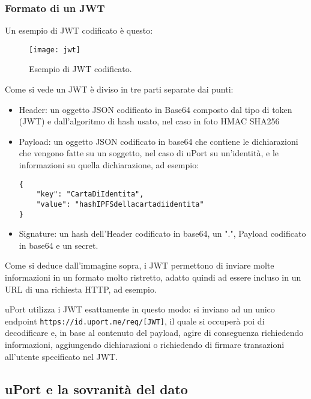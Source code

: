 \subsubsection{Formato di un JWT}

Un esempio di JWT codificato è questo:

\begin{figure}[!ht]
    \texttt{[image: jwt]}
    \caption{Esempio di JWT codificato.}
    \label{fig:jwt}
\end{figure}

Come si vede un JWT è diviso in tre parti separate dai punti:

\begin{itemize}
    \item {\color{headerColor} Header}: un oggetto JSON codificato in Base64
    composto dal tipo di token (JWT) e dall'algoritmo di hash 
    usato, nel caso in foto HMAC SHA256
    \item {\color{payloadColor} Payload}: un oggetto JSON codificato in base64
    che contiene le dichiarazioni
    che vengono fatte su un soggetto, nel caso di uPort su un'identità, e le informazioni
    su quella dichiarazione, ad esempio:

    \begin{lstlisting}
{
    "key": "CartaDiIdentita",
    "value": "hashIPFSdellacartadiidentita"
}
    \end{lstlisting}
    \item {\color{signatureColor} Signature}: un hash dell'Header codificato in base64,
    un ".", Payload codificato in base64 e un secret.
\end{itemize}

Come si deduce dall'immagine sopra, i JWT permettono di inviare 
molte informazioni in un formato molto ristretto, adatto quindi ad essere incluso in un
URL di una richiesta HTTP, ad esempio. 

uPort utilizza i JWT esattamente in questo modo: si inviano ad un unico endpoint
\texttt{https://id.uport.me/req/[JWT]},
il quale si occuperà poi di decodificare e, in base al contenuto del payload,
agire di conseguenza richiedendo informazioni, aggiungendo
dichiarazioni o richiedendo di firmare transazioni all'utente specificato nel JWT. 

\subsection{uPort e la sovranità del dato}

